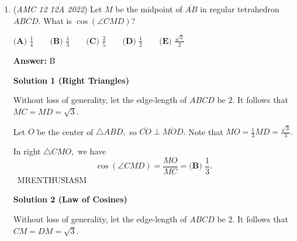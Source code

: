 \begin{enumerate}
 \textbf{Case 2} 
 \[\log_6 9 - \log_6 x_2 = -2d\]Subbing in for $-2d$ and using log rules,
 \[\log_6 \frac{9}{x_2} = \log_6 \frac{9}{25}\]From this we conclude that
 \[\frac{9}{x_2} = \frac{9}{25} \implies x_2 = 25\]

 Finding the product of the distinct values,$x_1x_2 = \boxed{\textbf{(E) } 81}$




\textbf{Solution 4 (Cheesing / Estimation)}

Estimate $\log_6 10 \approx 1.25$, so the distance to $1$ is roughly $0.25$. Twice that distance is around $0.5$.

 To find $x$, step $0.5$ above and below $\log_6 9 \approx 1.25$:

 
            \begin{itemize}
        \item $\log_6 x_1 \approx 1.75 \implies x_1 = 6^{1.75} \approx 23$
        \item $\log_6 x_2 \approx 0.75 \implies x_2 = 6^{0.75} \approx 3.8$
            \end{itemize}
            Multiplying our estimates yields $23 \cdot 3.8 \approx \boxed{\textbf{(E) } 81}$.~ Faris

 


	\item (\textit{AMC 12 12A 2022}) Let $M$ be the midpoint of $\overline{AB}$ in regular tetrahedron $ABCD$. What is $\cos(\angle CMD)$?


 $\textbf{(A) } \frac14 \qquad \textbf{(B) } \frac13 \qquad \textbf{(C) } \frac25 \qquad \textbf{(D) } \frac12 \qquad \textbf{(E) } \frac{\sqrt{3}}{2}$

 \textbf{Answer: }B



\textbf{Solution 1 (Right Triangles)}

Without loss of generality, let the edge-length of $ABCD$ be $2.$ It follows that $MC=MD=\sqrt3.$

 Let $O$ be the center of $\triangle ABD,$ so $\overline{CO}\perp\overline{MOD}.$ Note that $MO=\frac13 MD=\frac{\sqrt{3}}{3}.$

 In right $\triangle CMO,$ we have 
 \[\cos(\angle CMD)=\frac{MO}{MC}=\boxed{\textbf{(B) } \frac13}.\]~MRENTHUSIASM

 



\textbf{Solution 2 (Law of Cosines)}

Without loss of generality, let the edge-length of $ABCD$ be $2.$ It follows that $CM=DM=\sqrt3.$


\end{enumerate}
